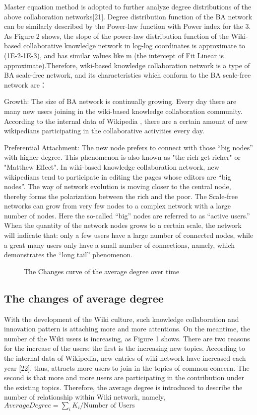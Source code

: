 \documentclass{elsarticle}
\begin{document}
Master equation method is adopted to further analyze degree
distributions of the above collaboration networks[21]. Degree
distribution function of the BA network can be similarly described by
the Power-law function with Power index for the 3. As Figure 2 shows,
the slope of the power-law distribution function of the Wiki-based
collaborative knowledge network in log-log coordinates is approximate
to (1E-2-1E-3), and has similar values like m (the intercept of Fit
Linear is approximate).Therefore, wiki-based knowledge collaboration network is a type
of BA scale-free network, and its characteristics which conform to the
BA scale-free network are：

Growth: The size of BA network is continually growing. Every day there
are many new users joining in the wiki-based knowledge collaboration
community. According to the internal data of
Wikipedia%
,
there are a certain amount of new wikipedians participating in the
collaborative activities every day. 

Preferential Attachment: The new node prefers to connect with those
“big nodes” with higher degree. This phenomenon is also known as "the
rich get richer" or "Matthew Effect". In wiki-based knowledge
collaboration network, new wikipedians tend to participate in editing
the pages whose editors are “big nodes”. The way of network evolution
is moving closer to the central node, thereby forms the polarization
between the rich and the poor. The Scale-free networks can grow from
very few nodes to a complex network with a large number of nodes. Here
the so-called “big” nodes are referred to as “active users.” When the
quantity of the network nodes grows to a certain scale, the network
will indicate that: only a few users have a large number of connected
nodes, while a great many users only have a small number of
connections, namely, which demonstrates the “long tail” phenomenon. 

\begin{figure}[htpb]
  \centering
  \scalebox{0.3}{\texttt{[image: 03]}}
  \caption{The Changes curve of the average degree over time}
\end{figure}

\subsection{The changes of average degree}
\label{sec:chang-aver-degr}

With the development of the Wiki culture, such knowledge collaboration
and innovation pattern is attaching more and more attentions. On the
meantime, the number of the Wiki users is increasing, as Figure
1 shows. There are two reasons for the increase of the users: the first
is the increasing new topics. According to the internal data of
Wikipedia, new entries of wiki network have increased each year [22],
thus, attracts more users to join in the topics of common concern. The
second is that more and more users are participating in the
contribution under the existing topics. Therefore, the average degree
is introduced to describe the number of relationship within Wiki
network, namely,$AverageDegree = \sum_iK_i/\text{Number of Users}$
\end{document}
